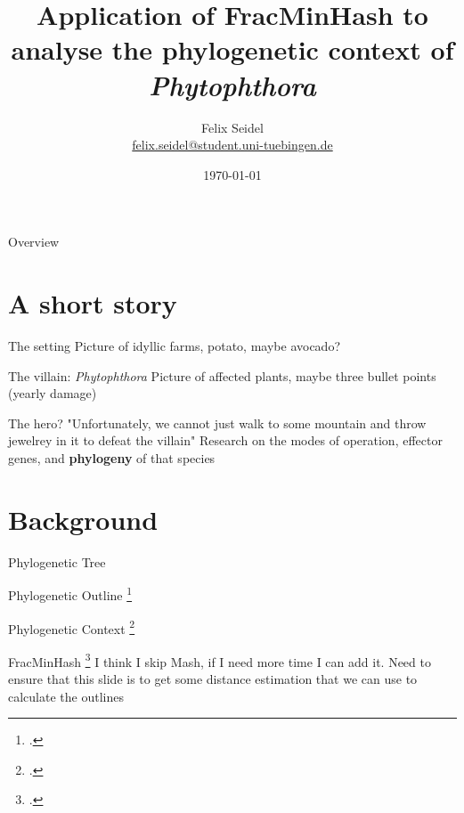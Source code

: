 \documentclass[aspectratio=169]{beamer}
\title{Application of FracMinHash to analyse the phylogenetic context of \textit{Phytophthora}}
\date{\today}
\author{ Felix Seidel \\
\href{mailto:felix.seidel@student.uni-tuebingen.de}{felix.seidel@student.uni-tuebingen.de}
}
\begin{document}
\maketitle

\begin{frame}{Overview}
    \tableofcontents
\end{frame}

\section{A short story}
\begin{frame}{The setting}
    Picture of idyllic farms, potato, maybe avocado?
\end{frame}

\begin{frame}{The villain: \textit{Phytophthora}}
    Picture of affected plants, maybe three bullet points (yearly damage)
\end{frame}

\begin{frame}{The hero?}
    "Unfortunately, we cannot just walk to some mountain and throw jewelrey in
    it to defeat the villain" Research on the modes of operation, effector
    genes, and \textbf{phylogeny} of that species
\end{frame}

\section{Background}
\begin{frame}{Phylogenetic Tree}

\end{frame}

\begin{frame}{Phylogenetic Outline \footcite{bryantNeighborNetImprovedAlgorithms2023,bagciMicrobialPhylogeneticContext2021}}
    
\end{frame}

\begin{frame}{Phylogenetic Context \footcite{bagciMicrobialPhylogeneticContext2021}}
    
\end{frame}

\begin{frame}{FracMinHash \footcite{irberLightweightCompositionalAnalysis2022}}
    I think I skip Mash, if I need more time I can add it. Need to ensure that
    this slide is to get some distance estimation that we can use to calculate
    the outlines
\end{frame}
\end{document}
